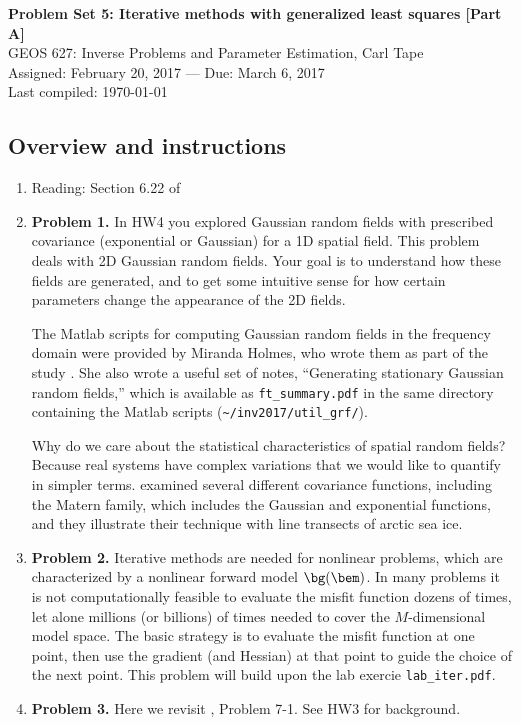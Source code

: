 \documentclass[11pt,titlepage,fleqn]{article}
\begin{document}
 

\begin{spacing}{1.2}
\centering
{\large \bf Problem Set 5: Iterative methods with generalized least squares [Part A]} \\
GEOS 627: Inverse Problems and Parameter Estimation, Carl Tape \\
Assigned: February 20, 2017 --- Due: March 6, 2017 \\
Last compiled: \today
\end{spacing}


\subsection*{Overview and instructions}

\begin{enumerate}
\item Reading: Section 6.22 of \citet{Tarantola2005}

\item {\bf Problem 1.} In HW4 you explored Gaussian random fields with prescribed covariance (exponential or Gaussian) for a 1D spatial field. This problem deals with 2D Gaussian random fields. Your goal is to understand how these fields are generated, and to get some intuitive sense for how certain parameters change the appearance of the 2D fields.

The Matlab scripts for computing Gaussian random fields in the frequency domain were provided by Miranda Holmes, who wrote them as part of the study \citet{BuhlerHolmes2009}. She also wrote a useful set of notes, ``Generating stationary Gaussian random fields,'' which is available as \verb+ft_summary.pdf+ in the same directory containing the Matlab scripts (\verb+~/inv2017/util_grf/+).

Why do we care about the statistical characteristics of spatial random fields? Because real systems have complex variations that we would like to quantify in simpler terms. \citet{Gneiting2012} examined several different covariance functions, including the Matern family, which includes the Gaussian and exponential functions, and they illustrate their technique with line transects of arctic sea ice.

\item {\bf Problem 2.} Iterative methods are needed for nonlinear problems, which are characterized by a nonlinear forward model $\bg(\bem)$. In many problems it is not computationally feasible to evaluate the misfit function dozens of times, let alone millions (or billions) of times needed to cover the $M$-dimensional model space. The basic strategy is to evaluate the misfit function at one point, then use the gradient (and Hessian) at that point to guide the choice of the next point. This problem will build upon the lab exercie \verb+lab_iter.pdf+.

\item {\bf Problem 3.} Here we revisit \citet{Tarantola2005}, Problem 7-1. See HW3 for background.

\end{enumerate}
\end{document}
